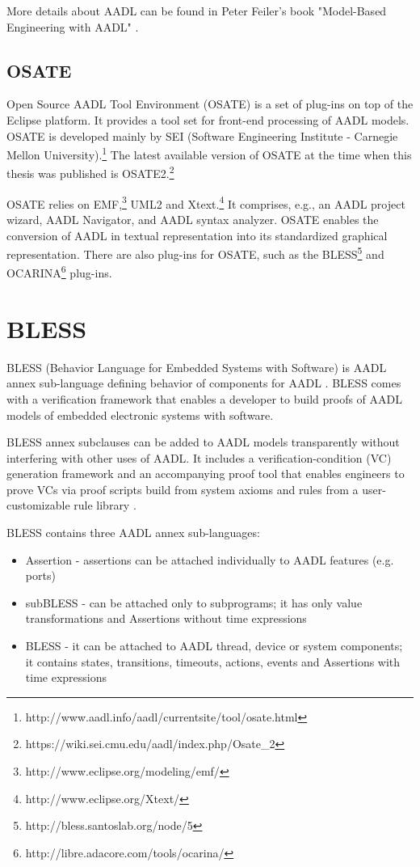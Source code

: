 More details about AADL can be found in Peter Feiler's book "Model-Based Engineering with AADL" \cite{AadlBook}.


\subsection{OSATE}
\label{background:aadl:osate}

Open Source AADL Tool Environment (OSATE) is a set of plug-ins on top of the Eclipse platform. It provides a tool set for front-end processing of AADL models. OSATE is developed mainly by SEI (Software Engineering Institute - Carnegie Mellon University).\footnote{http://www.aadl.info/aadl/currentsite/tool/osate.html} The latest available version of OSATE at the time when this thesis was published is OSATE2.\footnote{https://wiki.sei.cmu.edu/aadl/index.php/Osate\_2} 

OSATE relies on EMF,\footnote{http://www.eclipse.org/modeling/emf/} UML2 and Xtext.\footnote{http://www.eclipse.org/Xtext/} It comprises, e.g., an AADL project wizard, AADL Navigator, and AADL syntax analyzer. OSATE enables the conversion of AADL in textual representation into its standardized graphical representation. There are also plug-ins for OSATE, such as the BLESS\footnote{http://bless.santoslab.org/node/5} and OCARINA\footnote{http://libre.adacore.com/tools/ocarina/} plug-ins.



\section{BLESS}
\label{background:bless}
BLESS (Behavior Language for Embedded Systems with Software) is AADL annex sub-language defining behavior of components for AADL \cite{Bless:Paper}. BLESS comes with a verification framework that enables a developer to build proofs of AADL models of embedded electronic systems with software.

BLESS annex subclauses can be added to AADL models transparently without interfering with other uses of AADL. It includes a verification-condition (VC) generation framework and an accompanying proof tool that enables engineers to prove VCs via proof scripts build from system axioms and rules from a user-customizable rule library \cite{Bless:Paper}.

BLESS contains three AADL annex sub-languages:
\begin{itemize} \itemsep1pt \parskip0pt 
	\item Assertion - assertions can be attached individually to AADL features (e.g. ports)
	\item subBLESS - can be attached only to subprograms; it has only value transformations and Assertions without time expressions
	\item BLESS - it can be attached to AADL thread, device or system components; it contains states, transitions, timeouts, actions, events and Assertions with time expressions
\end{itemize}


